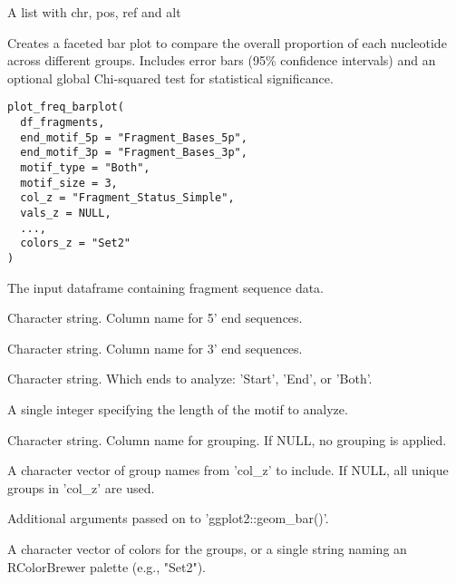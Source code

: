 \documentclass[a4paper]{book}
\begin{document}
%
\begin{Value}
A list with chr, pos, ref and alt
\end{Value}
%
\begin{Description}
Creates a faceted bar plot to compare the overall proportion of each nucleotide across different groups. Includes
error bars (95\% confidence intervals) and an optional global Chi-squared test for statistical significance.
\end{Description}
%
\begin{Usage}
\begin{verbatim}
plot_freq_barplot(
  df_fragments,
  end_motif_5p = "Fragment_Bases_5p",
  end_motif_3p = "Fragment_Bases_3p",
  motif_type = "Both",
  motif_size = 3,
  col_z = "Fragment_Status_Simple",
  vals_z = NULL,
  ...,
  colors_z = "Set2"
)
\end{verbatim}
\end{Usage}
%
\begin{Arguments}
\begin{ldescription}
\item[\code{df\_fragments}] The input dataframe containing fragment sequence data.

\item[\code{end\_motif\_5p}] Character string. Column name for 5' end sequences.

\item[\code{end\_motif\_3p}] Character string. Column name for 3' end sequences.

\item[\code{motif\_type}] Character string. Which ends to analyze: 'Start', 'End', or 'Both'.

\item[\code{motif\_size}] A single integer specifying the length of the motif to analyze.

\item[\code{col\_z}] Character string. Column name for grouping. If NULL, no grouping is applied.

\item[\code{vals\_z}] A character vector of group names from 'col\_z' to include.
If NULL, all unique groups in 'col\_z' are used.

\item[\code{...}] Additional arguments passed on to 'ggplot2::geom\_bar()'.

\item[\code{colors\_z}] A character vector of colors for the groups, or a single string
naming an RColorBrewer palette (e.g., "Set2").
\end{ldescription}
\end{Arguments}
\end{document}
